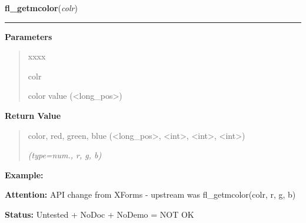 \hspace{.8\funcindent}\begin{boxedminipage}{\funcwidth}

    \raggedright \textbf{fl\_getmcolor}(\textit{colr})

    \vspace{-1.5ex}

    \rule{\textwidth}{0.5\fboxrule}
\setlength{\parskip}{2ex}
\setlength{\parskip}{1ex}
      \textbf{Parameters}
      \vspace{-1ex}

      \begin{quote}
        \begin{Ventry}{xxxx}

          \item[colr]

          color value ({\textless}long\_pos{\textgreater})

        \end{Ventry}

      \end{quote}

      \textbf{Return Value}
    \vspace{-1ex}

      \begin{quote}
      color, red, green, blue ({\textless}long\_pos{\textgreater}, 
      {\textless}int{\textgreater}, {\textless}int{\textgreater}, 
      {\textless}int{\textgreater})

      {\it (type=num., r, g, b)}

      \end{quote}

\textbf{Example:} 

\textbf{Attention:} API change from XForms - upstream was fl\_getmcolor(colr, r, g, b)



\textbf{Status:} Untested + NoDoc + NoDemo = NOT OK



    \end{boxedminipage}

    \label{xformslib:library:fl_get_pixel}

    \vspace{0.5ex}

